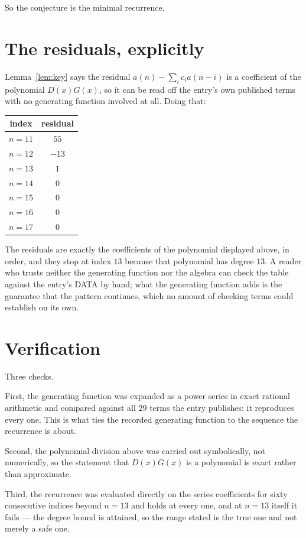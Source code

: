 \documentclass[11pt,a4paper]{article}
\theoremstyle{plain}
\theoremstyle{definition}
\begin{document}
So the conjecture is the minimal recurrence.

\section{The residuals, explicitly}

Lemma~\ref{lem:key} says the residual $a(n)-\sum_ic_ia(n-i)$ is a coefficient of the
polynomial $D(x)G(x)$, so it can be read off the entry's own published terms with no
generating function involved at all. Doing that:
\begin{center}
\begin{tabular}{cc}
index & residual \\ \hline
$n=11$ & $55$ \\
$n=12$ & $-13$ \\
$n=13$ & $1$ \\
$n=14$ & $0$ \\
$n=15$ & $0$ \\
$n=16$ & $0$ \\
$n=17$ & $0$
\end{tabular}
\end{center}
The residuals are exactly the coefficients of the polynomial displayed above, in order, and
they stop at index $13$ because that polynomial has degree $13$. A reader who trusts
neither the generating function nor the algebra can check the table against the entry's DATA
by hand; what the generating function adds is the guarantee that the pattern continues, which
no amount of checking terms could establish on its own.

\section{Verification}

Three checks.

First, the generating function was expanded as a power series in exact rational arithmetic and
compared against all $29$ terms the entry publishes: it reproduces every one. This is
what ties the recorded generating function to the sequence the recurrence is about.

Second, the polynomial division above was carried out symbolically, not numerically, so the
statement that $D(x)G(x)$ is a polynomial is exact rather than approximate.

Third, the recurrence was evaluated directly on the series coefficients for sixty consecutive
indices beyond $n=13$ and holds at every one, and at $n=13$ itself it fails --- the
degree bound is attained, so the range stated is the true one and not merely a safe one.
\end{document}
